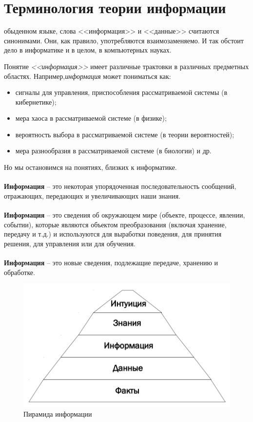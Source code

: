 \section{Терминология теории информации}
 обыденном языке, слова <<информация>> и <<данные>> считаются синонимами. Они, как правило, употребляются взаимозаменяемо. И так обстоит дело в информатике и в целом, в компьютерных науках.



Понятие \textit{<<информация>>} имеет различные трактовки в различных предметных областях. Например,\textit{информация} может пониматься как:
\begin{itemize}
\item сигналы для управления, приспособления рассматриваемой системы (в кибернетике);
\item мера хаоса в рассматриваемой системе (в физике);
\item вероятность выбора в рассматриваемой системе (в теории вероятностей);
\item мера разнообразия в рассматриваемой системе (в биологии) и др.
\end{itemize}
 Но мы остановимся на понятиях, близких к информатике.
\\
\\\textbf{Информация} -- это некоторая упорядоченная последовательность сообщений, отражающих, передающих и увеличивающих наши знания.
\\
\\\textbf{Информация} -- это сведения об окружающем мире (объекте, процессе, явлении, событии), которые являются объектом преобразования (включая хранение, передачу и т.д.) и используются для выработки поведения, для принятия решения, для управления или для обучения.
\\
\\\textbf{Информация} -- это новые сведения, подлежащие передаче, хранению и обработке.
\begin{figure}[b]
\center\includegraphics[scale=0.25]{images/0_2_1.png}
\caption{Пирамида информации}
\end{figure}
